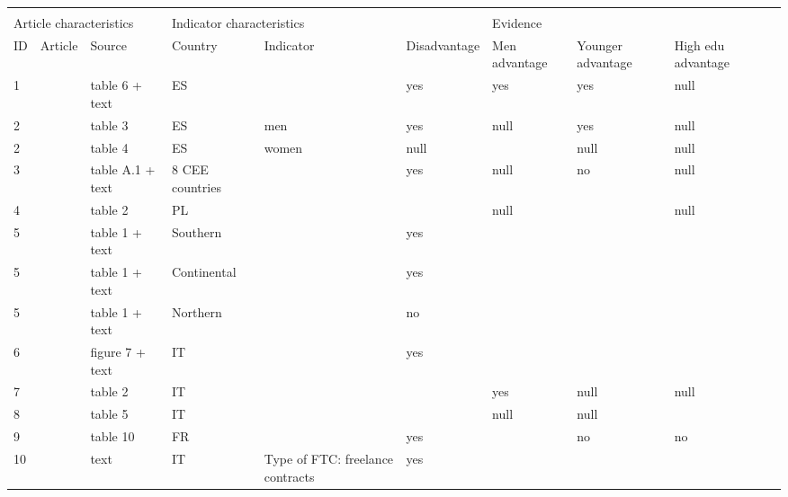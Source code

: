 \begin{tabular}{llll>{\raggedright\arraybackslash}p{1in}>{\raggedright\arraybackslash}p{1in}>{\raggedright\arraybackslash}p{1in}>{\raggedright\arraybackslash}p{1in}>{\raggedright\arraybackslash}p{1in}>{\raggedright\arraybackslash}p{1.3in}}
   \\[-1.8ex]\hline\hline \\ 
 [-1.8ex] \multicolumn{3}{l}{Article characteristics} 
& \multicolumn{3}{l}{Indicator characteristics} 
& \multicolumn{4}{l}{Evidence} 
\\ 

            \cmidrule(lr){1-3} 
            \cmidrule(lr){4-6}
            \cmidrule(lr){7-10} ID 
& Article 
& Source
& Country
& Indicator
& Disadvantage
& Men advantage
& Younger advantage
& High edu advantage
& \multicolumn{1}{>{\raggedright\arraybackslash}p{1.3in}}{Disadvantage declines over time}
             \\ 
 \hline
1 & \citealp{amuedo_dorantes_2000} & table 6 + text & ES &  & yes & yes & yes & null &  \\ 
  2 & \citealp{arranz_etal_2010} & table 3 & ES & men & yes & null & yes & null &  \\ 
  2 & \citealp{arranz_etal_2010} & table 4 & ES & women & null &  & null & null &  \\ 
  3 & \citealp{babos_2014} & table A.1 + text & 8 CEE countries &  & yes & null & no & null &  \\ 
  4 & \citealp{baranowska_etal_2011} & table 2 & PL &  &  & null &  & null &  \\ 
  5 & \citealp{barbieri_cutuli_2016} & table 1 + text & Southern &  & yes &  &  &  &  \\ 
  5 & \citealp{barbieri_cutuli_2016} & table 1 + text & Continental &  & yes &  &  &  &  \\ 
  5 & \citealp{barbieri_cutuli_2016} & table 1 + text & Northern &  & no &  &  &  &  \\ 
  6 & \citealp{barbieri_cutuli_2018} & figure 7 + text & IT &  & yes &  &  &  &  \\ 
  7 & \citealp{barbieri_scherer_2009} & table 2 & IT &  &  & yes & null & null &  \\ 
  8 & \citealp{barbieri_sestito_2008} & table 5 & IT &  &  & null & null &  &  \\ 
  9 & \citealp{berson_2018} & table 10 & FR &  & yes &  & no & no &  \\ 
  10 & \citealp{berton_etal_2011} & text & IT & Type of FTC: freelance contracts & yes &  &  &  &  \\ 

\end{tabular}
